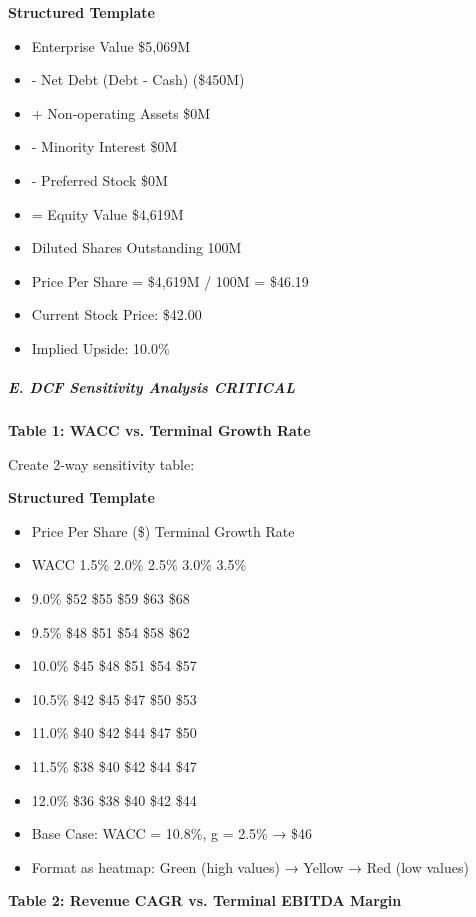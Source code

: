 \documentclass[11pt]{article}
\begin{document}
\textbf{Structured Template}
\begin{itemize}[leftmargin=*,itemsep=2pt,topsep=2pt]
\item {} Enterprise Value \$5,069M
\item {} - Net Debt (Debt - Cash) (\$450M)
\item {} + Non-operating Assets \$0M
\item {} - Minority Interest \$0M
\item {} - Preferred Stock \$0M
\item {} = Equity Value \$4,619M
\item {} Diluted Shares Outstanding 100M
\item {} Price Per Share = \$4,619M / 100M = \$46.19
\item {} Current Stock Price: \$42.00
\item {} Implied Upside: 10.0\%
\end{itemize}

\subparagraph{E. DCF Sensitivity Analysis \textbf{CRITICAL}}\mbox{}\par

\textbf{Table 1: WACC vs. Terminal Growth Rate}


Create 2-way sensitivity table:

\textbf{Structured Template}
\begin{itemize}[leftmargin=*,itemsep=2pt,topsep=2pt]
\item {} Price Per Share (\$) Terminal Growth Rate
\item {} WACC 1.5\% 2.0\% 2.5\% 3.0\% 3.5\%
\item {} 9.0\% \$52 \$55 \$59 \$63 \$68
\item {} 9.5\% \$48 \$51 \$54 \$58 \$62
\item {} 10.0\% \$45 \$48 \$51 \$54 \$57
\item {} 10.5\% \$42 \$45 \$47 \$50 \$53
\item {} 11.0\% \$40 \$42 \$44 \$47 \$50
\item {} 11.5\% \$38 \$40 \$42 \$44 \$47
\item {} 12.0\% \$36 \$38 \$40 \$42 \$44
\item {} Base Case: WACC = 10.8\%, g = 2.5\% → \$46
\item {} Format as heatmap: Green (high values) → Yellow → Red (low values)
\end{itemize}

\textbf{Table 2: Revenue CAGR vs. Terminal EBITDA Margin}
\end{document}
